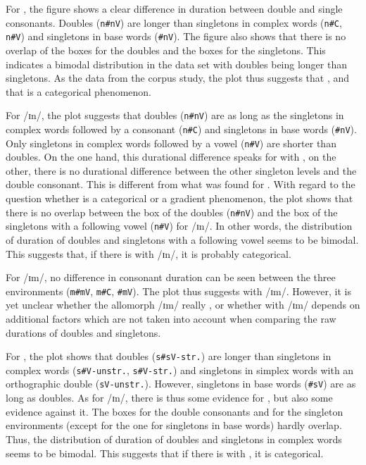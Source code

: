 For ,  the figure shows a clear difference in duration between double and single consonants. Doubles (\texttt{n\#nV}) are longer than singletons in complex words (\texttt{n\#C}, \texttt{n\#V}) and singletons in base words (\texttt{\#nV}). 
  The figure also shows that there is no overlap of the boxes for the doubles and the boxes for the singletons. This indicates a bimodal distribution in the data set with doubles being longer than singletons. 
As the data from the corpus study, the  plot thus suggests that  , and that  is a categorical phenomenon. 



For /ɪn/, the plot suggests that doubles (\texttt{n\#nV}) are as long as the singletons in complex words followed by a consonant (\texttt{n\#C}) and singletons in base words (\texttt{\#nV}). Only singletons in complex words followed by a vowel (\texttt{n\#V}) are shorter than doubles. 
On the one hand, this durational difference speaks for  with , on the other, there is no durational difference between the other singleton levels and the double consonant. This is different from what was found for .
With regard to the question whether  is a categorical or a gradient phenomenon, the plot shows that there is no overlap between the box of the doubles (\texttt{n\#nV}) and the box of the singletons with a following vowel (\texttt{n\#V}) for /ɪn/. In other words, the distribution of duration of doubles and singletons with a following vowel seems to be bimodal. This suggests that, if there is  with /ɪn/, it is probably categorical.

For /ɪm/, no difference in consonant duration can be seen between the three environments (\texttt{m\#mV}, \texttt{m\#C}, \texttt{\#mV}). The plot thus suggests  with /ɪm/. However, 
it is yet unclear whether the allomorph /ɪm/ really , or whether  with /ɪm/ depends on additional factors which are not taken into account when comparing the raw durations of doubles and singletons. 


For , the plot shows that doubles (\texttt{s\#sV-str.})  are longer than singletons in complex words (\texttt{s\#V-unstr.}, \texttt{s\#V-str.}) and singletons in simplex words with an orthographic double (\texttt{sV-unstr.}). However, singletons in base words (\texttt{\#sV}) are as long as doubles. 
As for /ɪn/, there is thus some evidence for , but also some evidence against it.  
The boxes for the double consonants and  for the singleton environments (except for the one for singletons in base words)  hardly overlap. Thus, the distribution of duration of doubles and singletons in complex words seems to be bimodal. This suggests that if there is  with , it is categorical.


